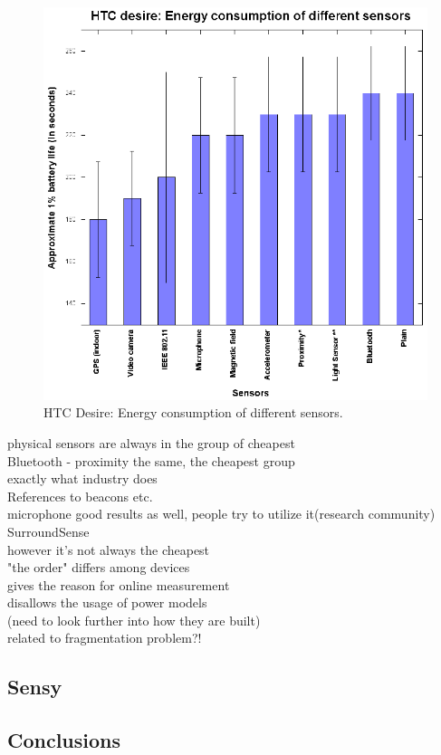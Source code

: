 \begin{figure}[H]
\centering
\includegraphics[scale=1.5]{plots/htc_desire.eps}
\caption{HTC Desire: Energy  consumption of different sensors.}
\end{figure}

physical sensors are always in the group of cheapest \\

Bluetooth - proximity the same, the cheapest group\\
				exactly what industry does\\
				References to beacons etc.\\

microphone good results as well, people try to utilize it(research community)\\
				SurroundSense \cite{azizyan:surroundsense}\\
				however it's not always the cheapest\\
				
				
"the order" differs among devices\\
	gives the reason for online measurement\\
	disallows the usage of power models\\
		(need to look further into how they are built)\\
		related to fragmentation problem?!\\
								
\subsection{Sensy}
\subsection{Conclusions}